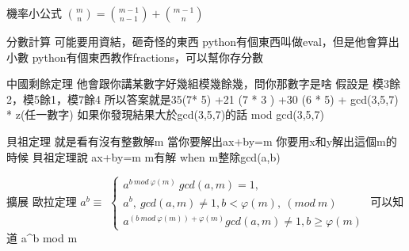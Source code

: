 機率小公式
$\binom{m}{n}=\binom{m-1}{n-1}+\binom{m-1}{n}$

分數計算
可能要用資結，砸奇怪的東西
python有個東西叫做eval，但是他會算出小數
python有個東西教作fractions，可以幫你存分數

中國剩餘定理
他會跟你講某數字好幾組模幾餘幾，問你那數字是啥
假設是
模3餘2，模5餘1，模7餘4
所以答案就是35(7* 5) +21 (7 * 3 ) +30 (6 * 5) + gcd(3,5,7) * z(任一數字)
如果你發現結果大於gcd(3,5,7)的話 mod gcd(3,5,7)

貝祖定理 就是看有沒有整數解m
當你要解出ax+by=m
你要用x和y解出這個m的時候
貝祖定理說
ax+by=m
m有解 when m整除gcd(a,b)

擴展 歐拉定理
$a^b \equiv$
$
\begin{cases}
a^{b \ mod \ \varphi(m)}\ gcd(a,m)=1, \\
a^b,\ gcd(a,m) \ne 1, b < \varphi(m),\ (mod\  m)  \\
a^{(b \ mod \ \varphi(m))+\varphi(m)} gcd(a,m) \ne 1, b \ge \varphi(m)
\end{cases}
$
可以知道 a^b mod m

